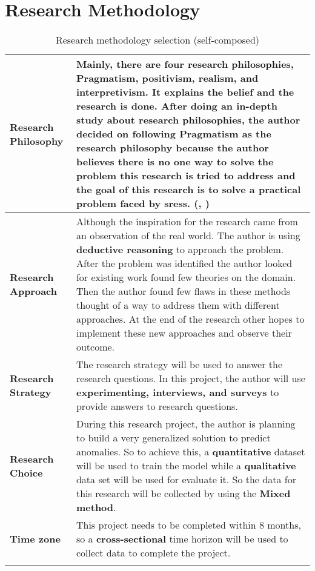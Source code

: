 \section{Research Methodology} \label{sec:methodology}


\begin{longtable}{|p{35mm}|p{125mm}|}
\hline
  \textbf{Research Philosophy} & 
  Mainly, there are four research philosophies, Pragmatism, positivism, realism, and interpretivism. It explains the belief and the research is done. After doing an in-depth study about research philosophies, the author decided on following \textbf{Pragmatism} as the research philosophy because the author believes there is no one way to solve the problem this research is tried to address and the goal of this research is to solve a practical problem faced by \acp{sres}. (\cite{1Philoso75:online}, \cite{Pragmati87:online})
  \\ \hline
  
  \textbf{Research Approach} & 
  Although the inspiration for the research came from an observation of the real world. The author is using \textbf{deductive reasoning} to approach the problem. After the problem was identified the author looked for existing work found few theories on the domain. Then the author found few flaws in these methods thought of a way to address them with different approaches. At the end of the research other hopes to implement these new approaches and observe their outcome.
  \\ \hline
  
  \textbf{Research Strategy} & 
  The research strategy will be used to answer the research questions. In this project, the author will use \textbf{experimenting, interviews, and surveys} to provide answers to research questions.
  \\ \hline
  
  \textbf{Research Choice} & 
  During this research project, the author is planning to build a very generalized solution to predict anomalies.  So to achieve this, a \textbf{quantitative} dataset will be used to train the model while a \textbf{qualitative} data set will be used for evaluate it. So the data for this research will be collected by using the \textbf{Mixed method}.
  \\ \hline
  
  \textbf{Time zone} & 
  This project needs to be completed within 8 months, so a \textbf{cross-sectional} time horizon will be used to collect data to complete the project.
  \\ \hline
  \caption{Research methodology selection (self-composed)}
\end{longtable}
